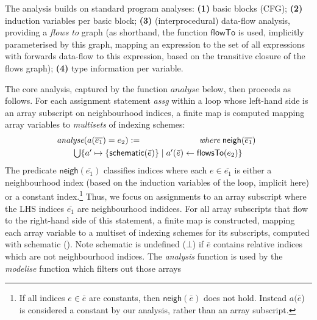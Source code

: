 \documentclass[10pt,preprint,numbers]{sigplanconf}
\newcounter{block}
\theoremstyle{definition}
\newcommand{\arrayTy}{\textsf{array}}
\begin{document}
\newcommand{\neigh}{\textsf{neigh}}

The analysis builds on standard program analyses:
%
\textbf{(1)} basic blocks (CFG);
\textbf{(2)} induction variables per basic block;
\textbf{(3)} (interprocedural) data-flow analysis, providing a \emph{flows to}
  graph (as shorthand, the function
  $\mathsf{flowTo}$ is used, implicitly parameterised by this graph,
  mapping an expression to the set of all expressions
  with forwards data-flow to this expression, based on the transitive
  closure of the flows graph);
\textbf{(4)} type information per variable.%

The core analysis, captured by the function $\textit{analyse}$ below, then proceeds as follows.
For each assignment statement \textit{assg} within a loop whose left-hand side is an array
subscript on neighbourhood indices, a finite map is computed mapping
array variables to \emph{multisets} of indexing schemes:
%
\begin{align*}
\hspace{-0.5em}
\begin{array}{lr}
\textit{analyse}(a(\overline{e_1}) = e_2)
 := \qquad\qquad\qquad & \textit{where} \; \neigh(\overline{e_1}) \\[0.3em]
\multicolumn{2}{l}{\qquad \bigcup\{a' \mapsto \{
\textsf{schematic}(\bar{e})\} \mid a'(\bar{e}) \leftarrow \mathsf{flowsTo}(e_2)\}}
\end{array}
\end{align*}
%
The predicate $\neigh(\bar{e_1})$ classifies indices where each
$e \in \bar{e_1}$ is either a
neighbourhood index (based on
the induction variables of the loop, implicit here)
or a constant index.\footnote{If all indices $e \in \bar{e}$ are constants, then
  $\neigh(\bar{e})$ does not hold. Instead $a(\bar{e}$) is
  considered a constant by our analysis, rather
than an array subscript.}%
Thus, we focus on assignments to an array subscript where the LHS
indices $\overline{e_1}$ are neighbourhood indidces.  For
all array subscripts that flow to the right-hand side of this
statement, a finite map is constructed, mapping each array variable
to a multiset of indexing schemes for its subscripts, computed
with \textsf{schematic} ().
Note \textsf{schematic} is undefined ($\bot$) if
$\bar{e}$ contains relative indices which are not neighbourhood
indices. The \textit{analysis} function is used by the
\textit{modelise} function which filters out those arrays
\end{document}
